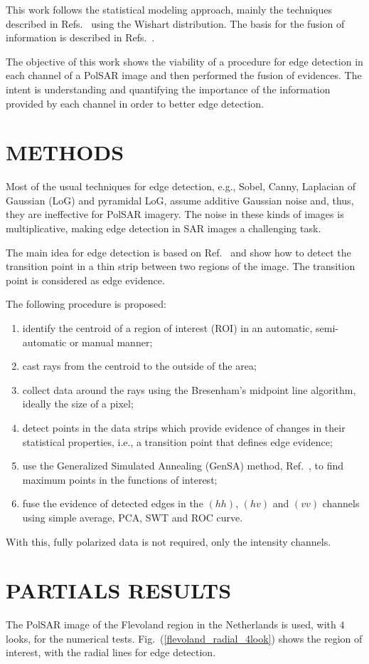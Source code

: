 \documentclass[a4paper,12pt]{article}
\begin{document}
This work follows the statistical modeling approach, mainly the techniques described in Refs.~\cite{fbgm, nhfc} using the Wishart distribution.
The basis for the fusion of information is described in Refs.~\cite{mit, sg}. 


The objective of this work shows the viability of a procedure for edge detection in each channel of a PolSAR image and then performed the fusion of evidences. The intent is understanding and quantifying the importance of the information provided by each channel in order to better edge detection.

	\section{METHODS} \label{sec:method}
Most of the usual techniques for edge detection, e.g., 
Sobel, Canny, Laplacian of Gaussian (LoG) and pyramidal LoG, assume additive Gaussian noise and, thus, they are ineffective for PolSAR imagery.
The noise in these kinds of images is multiplicative, making edge detection in SAR images a challenging task.

The main idea for edge detection is based on Ref.~\cite{nhfc, gmbf} and show how to detect the transition point in a thin strip between two regions of the image. The transition point is considered as edge evidence. 

The following procedure is proposed:
\begin{enumerate}
	\item identify the centroid of a region of interest (ROI) in an automatic, semi-automatic or manual manner;
	\item cast rays from the centroid to the outside of the area;
	\item collect data around the rays using the  Bresenham's midpoint line algorithm, ideally the size of a pixel;
	\item detect points in the data strips which provide evidence of changes in their statistical properties, i.e., a transition point that defines edge evidence;
	\item use the Generalized Simulated Annealing (GenSA) method, Ref.~\cite{xgsh}, to find maximum points in the functions of interest;
	\item fuse the evidence of detected edges in the $(hh)$, $(hv)$ and $(vv)$ channels using simple average, PCA, SWT and ROC curve.
\end{enumerate}
With this, fully polarized data is not required, only the intensity channels.
	\section{PARTIALS RESULTS} \label{sec:part_result}
The PolSAR image of the Flevoland region in the Netherlands is used, with $4$ looks, for the numerical tests. 
Fig.~(\ref{flevoland_radial_4look}) shows the region of interest, with the radial lines for edge detection.
\end{document}
